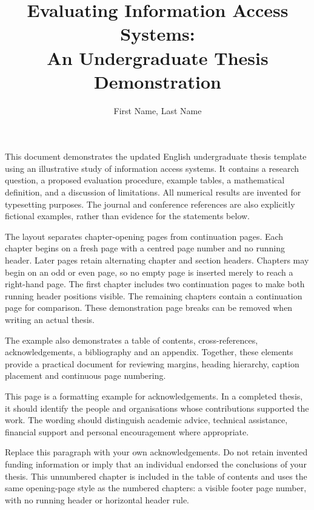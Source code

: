 \documentclass[a4paper,12pt,english,twoside,openany,dvipdfmx]{jsbook}
\title{Evaluating Information Access Systems:\\An Undergraduate Thesis Demonstration}
\author{First Name, Last Name}
\affiliation{Waseda University\\School of Fundamental Science and Engineering\\Department of Computer Science and Engineering}
\begin{document}
\maketitle

\begin{coverabstract}
This document demonstrates the updated English undergraduate thesis template using
an illustrative study of information access systems. It contains a research
question, a proposed evaluation procedure, example tables, a mathematical
definition, and a discussion of limitations. All numerical results are invented
for typesetting purposes. The journal and conference references are also
explicitly fictional examples, rather than evidence for the statements below.

The layout separates chapter-opening pages from continuation pages. Each chapter
begins on a fresh page with a centred page number and no running header. Later
pages retain alternating chapter and section headers. Chapters may begin on
an odd or even page, so no empty page is inserted merely to reach a right-hand
page. The first chapter includes two continuation pages to make both running
header positions visible. The remaining chapters contain a continuation page
for comparison. These demonstration page breaks can be removed when writing
an actual thesis.

The example also demonstrates a table of contents,
cross-references, acknowledgements, a bibliography and an appendix. Together,
these elements provide a practical document for reviewing margins, heading
hierarchy, caption placement and continuous page numbering.
\end{coverabstract}

\tableofcontents









\begin{acknowledgement}
This page is a formatting example for acknowledgements. In a completed thesis,
it should identify the people and organisations whose contributions supported
the work. The wording should distinguish academic advice, technical assistance,
financial support and personal encouragement where appropriate.

Replace this paragraph with your own acknowledgements. Do not retain invented
funding information or imply that an individual endorsed the conclusions of
your thesis. This unnumbered chapter is included in the table of contents and
uses the same opening-page style as the numbered chapters: a visible footer
page number, with no running header or horizontal header rule.
\end{acknowledgement}




\appendix

\end{document}
